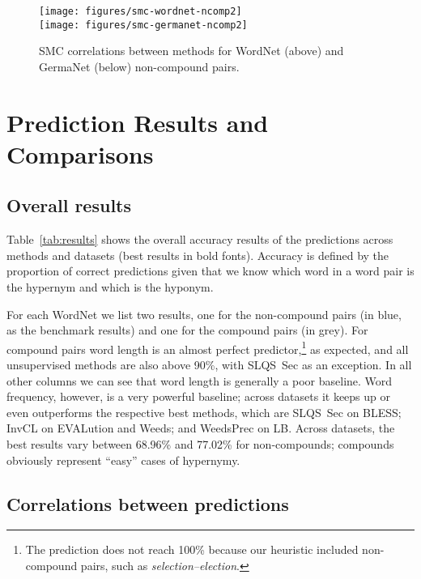 \documentclass[11pt,a4paper]{article}
\begin{document}
\begin{figure*}[h!]
  \centering
  \texttt{[image: figures/smc-wordnet-ncomp2]}
  \vspace{+5mm}\\
  \texttt{[image: figures/smc-germanet-ncomp2]}
  \caption{SMC correlations between methods for WordNet (above) and
    GermaNet (below) non-compound pairs.}
  \label{fig:smc}
\end{figure*}

\section{Prediction Results and Comparisons}

\subsection{Overall results}

Table~\ref{tab:results} shows the overall accuracy results of the
predictions across methods and datasets (best results in bold
fonts). Accuracy is defined by the proportion of correct predictions
given that we know which word in a word pair is the hypernym and which
is the hyponym.

For each WordNet we list two results, one for the non-compound
pairs (in blue, as the benchmark results) and one for the compound
pairs (in grey). For compound pairs word length is an almost perfect
predictor,\footnote{The prediction does not reach 100\% because our
  heuristic included non-compound pairs, such as
  \textit{selection--election}.} as expected, and all unsupervised
methods are also above 90\%, with SLQS~Sec as an exception.
In all other columns we can see that word length is generally a poor
baseline. Word frequency, however, is a very powerful baseline; across
datasets it keeps up or even outperforms the respective best methods,
which are SLQS~Sec on BLESS; InvCL on EVALution and Weeds; and
WeedsPrec on LB. Across
datasets, the best results vary between 68.96\% and 77.02\% for
non-compounds; compounds obviously represent ``easy'' cases of
hypernymy.


\subsection{Correlations between predictions}
\label{sec:smc}
\end{document}
